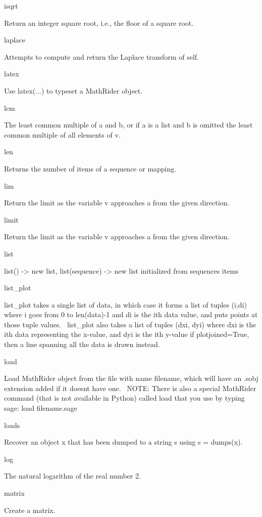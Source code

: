 \documentclass[12pt,twoside]{book}
\begin{document}
\bigskip

isqrt

Return an integer square root, i.e., the floor of a square root.

laplace

Attempts to compute and return the Laplace transform of self.

latex

Use latex(...) to typeset a MathRider object.

lcm

The least common multiple of a and b, or if a is a list and b is omitted the least common multiple of all elements of v.

len

Returns the number of items of a sequence or mapping.

lim

Return the limit as the variable v approaches a from the given direction.

limit

Return the limit as the variable v approaches a from the given direction.

list

list() {}-{\textgreater} new list, list(sequence) {}-{\textgreater} new list initialized from sequence{\textquotesingle}s items

list\_plot

list\_plot takes a single list of data, in which case it forms a list of tuples (i,di) where i goes from 0 to len(data){}-1 and di is the ith data value, and puts points at those tuple values. \ list\_plot also takes a list of tuples (dxi, dyi) where dxi is the ith data representing the x{}-value, and dyi is the ith y{}-value if plotjoined=True, then a line spanning all the data is drawn instead.

load

Load MathRider object from the file with name filename, which will have an .sobj extension added if it doesn{\textquotesingle}t have one. \ NOTE: There is also a special MathRider command (that is not available in Python) called load that you use by typing sage: load filename.sage

loads

Recover an object x that has been dumped to a string s using s = dumps(x).

log

The natural logarithm of the real number 2.

matrix

Create a matrix.
\end{document}
